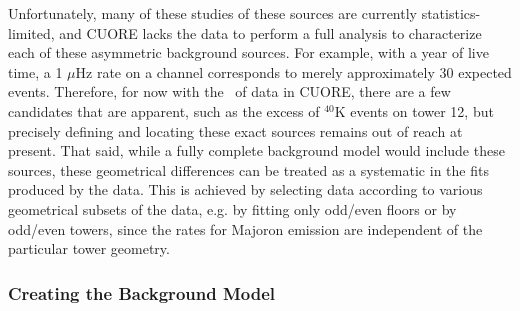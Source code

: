 Unfortunately, many of these studies of these sources are currently statistics-limited, and CUORE lacks the data to perform a full analysis to characterize each of these asymmetric background sources.
For example, with a year of live time, a 1 $\mu$Hz rate on a channel corresponds to merely approximately 30 expected events.
Therefore, for now with the \livetime~of data in CUORE, there are a few candidates that are apparent, such as the excess of $^{40}$K events on tower 12, but precisely defining and locating these exact sources remains out of reach at present.
That said, while a fully complete background model would include these sources, these geometrical differences can be treated as a systematic in the fits produced by the data.
This is achieved by selecting data according to various geometrical subsets of the data, e.g. by fitting only odd/even floors or by odd/even towers, since the rates for Majoron emission are independent of the particular tower geometry.

\subsubsection*{Creating the Background Model}

